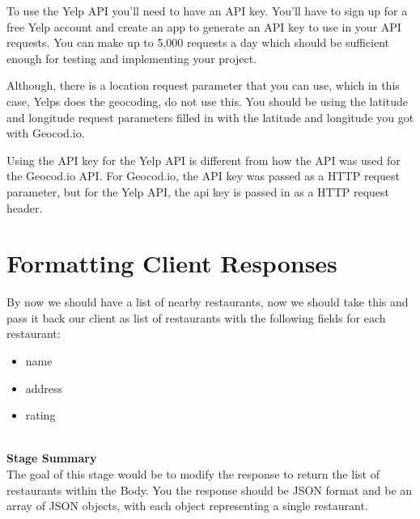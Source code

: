 \documentclass{article}
\begin{document}
\begin{info}
To use the Yelp API you'll need to have an API key. You'll have to sign up for a free Yelp account and create an app to generate an API key to use in your API requests. You can make up to 5,000 requests a day which should be sufficient enough for testing and implementing your project. 
\end{info}

\begin{info}
Although, there is a location request parameter that you can use, which in this case, Yelps does the geocoding, do not use this. You should be using the latitude and longitude request parameters filled in with the latitude and longitude you got with Geocod.io.
\end{info}

\begin{info}
Using the API key for the Yelp API is different from how the API was used for the Geocod.io API. For Geocod.io, the API key was passed as a HTTP request parameter, but for the Yelp API, the api key is passed in as a HTTP request header. 
\end{info}





\section{Formatting Client Responses}
By now we should have a list of nearby restaurants, now we should take this and pass it back our client as list of restaurants with the following fields for each restaurant:
\begin{itemize}
\item name
\item address
\item rating
\end{itemize}

\-\ \\
\textbf{Stage Summary}\\
The goal of this stage would be to modify the response to return the list of restaurants within the Body. You the response should be JSON format and be an array of JSON objects, with each object representing a single restaurant. 
\end{document}
